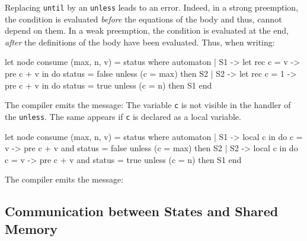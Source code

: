 \documentclass[11pt,titlepage,twoside]{report}
\newenvironment{sample}
  {\begin{flushright}\begin{minipage}[t]{15.3cm}\begin{alltt}\small}
  {\end{alltt}\end{minipage}\end{flushright}}
\begin{document}
Replacing \verb-until- by an \verb-unless- leads to an error. Indeed,
in a strong preemption, the condition is evaluated {\em before} the
equations of the body and thus, cannot depend on them. In a weak
preemption, the condition is evaluated at the end, {\em after} the
definitions of the body have been evaluated. Thus, when writing:
\begin{chklisting}[fail]
let node consume (max, n, v) = status where
  automaton
  | S1 ->
      let rec c = v -> pre c + v in
      do status = false
      unless (c = max) then S2
  | S2 ->
      let rec c = 1 -> pre c + v in
      do status = true
      unless (c = n) then S1
  end
\end{chklisting}
The compiler emits the message:
\chklistingerr{}
The variable \verb-c- is not visible in the handler of the \verb-unless-. The
same appears if \verb-c- is declared as a local variable.
\begin{chklisting}[fail]
let node consume (max, n, v) = status where
  automaton
  | S1 ->
      local c in
      do c = v -> pre c + v and status = false
      unless (c = max) then S2
  | S2 ->
      local c in
      do c = v -> pre c + v and status = true
      unless (c = n) then S1
  end
\end{chklisting}
The compiler emits the message:
\chklistingerr{}

\subsection{Communication between States and Shared Memory\label{commstateshared}} %
\end{document}
